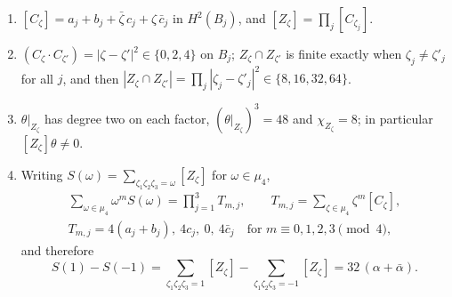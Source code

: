 \begin{lemma}\label{lem:cmcurves}
\begin{enumerate}[label=\textup{(\roman*)},leftmargin=2.4em,itemsep=2pt]
\item $[C_{\zeta}]=a_{j}+b_{j}+\bar\zeta\,c_{j}+\zeta\,\bar c_{j}$ in $H^{2}(B_{j})$, and $[Z_{\zeta}]=\prod_{j}[C_{\zeta_{j}}]$.
\item $(C_{\zeta}\cdot C_{\zeta'})=|\zeta-\zeta'|^{2}\in\{0,2,4\}$ on $B_{j}$; $Z_{\zeta}\cap Z_{\zeta'}$ is finite exactly when $\zeta_{j}\ne\zeta'_{j}$ for all $j$, and then $|Z_{\zeta}\cap Z_{\zeta'}|=\prod_{j}|\zeta_{j}-\zeta'_{j}|^{2}\in\{8,16,32,64\}$.
\item $\theta|_{Z_{\zeta}}$ has degree two on each factor, $(\theta|_{Z_{\zeta}})^{3}=48$ and $\chi_{Z_{\zeta}}=8$; in particular $[Z_{\zeta}]\theta\ne0$.
\item Writing $S(\omega)=\sum_{\zeta_{1}\zeta_{2}\zeta_{3}=\omega}[Z_{\zeta}]$ for $\omega\in\mu_{4}$,
\begin{equation}\label{eq:cmgenerating}
\begin{gathered}
\sum_{\omega\in\mu_{4}}\omega^{m}S(\omega)=\prod_{j=1}^{3}T_{m,j},\qquad T_{m,j}=\sum_{\zeta\in\mu_{4}}\zeta^{m}[C_{\zeta}],\\
T_{m,j}=4(a_{j}+b_{j}),\ 4c_{j},\ 0,\ 4\bar c_{j}\quad\text{for }m\equiv0,1,2,3\pmod 4,
\end{gathered}
\end{equation}
and therefore
\begin{equation}\label{eq:cm32}
S(1)-S(-1)=\sum_{\zeta_{1}\zeta_{2}\zeta_{3}=1}[Z_{\zeta}]-\sum_{\zeta_{1}\zeta_{2}\zeta_{3}=-1}[Z_{\zeta}]=32\,(\alpha+\bar\alpha).
\end{equation}
\end{enumerate}
\end{lemma}

